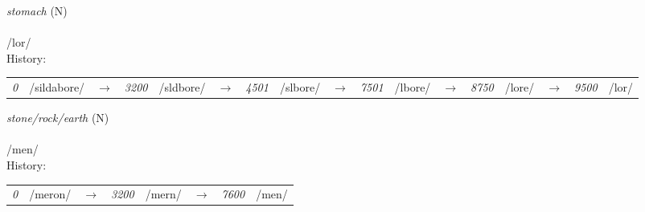 \vspace{15pt}
\begin{nopagebreak}
 \textit{stomach} (N)\\
\\
\noindent /l{\textprimstress}or/\\


\noindent History:

\vspace{-0pt}
\hspace{40pt}
\begin{tabular}{ccc}
\textit{0} & /sildabore/&$\rightarrow$ & \textit{3200} & /sldbore/&$\rightarrow$ & \textit{4501} & /slbore/&$\rightarrow$ & \textit{7501} & /lbore/&$\rightarrow$ & \textit{8750} & /lore/&$\rightarrow$ & \textit{9500} & /lor/& \\
\end{tabular}

\vspace{20pt}\hline

\end{nopagebreak}
\filbreak



\vspace{15pt}
\begin{nopagebreak}
 \textit{stone/rock/earth} (N)\\
\\
\noindent /m{\textprimstress}en/\\


\noindent History:

\vspace{-0pt}
\hspace{40pt}
\begin{tabular}{ccc}
\textit{0} & /meron/&$\rightarrow$ & \textit{3200} & /mern/&$\rightarrow$ & \textit{7600} & /men/& \\
\end{tabular}

\vspace{20pt}\hline

\end{nopagebreak}
\filbreak



